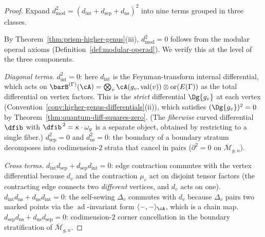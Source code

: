 \begin{proof}
Expand $d_{\mathrm{mod}}^2 = (d_{\mathrm{int}} + d_{\mathrm{sep}}
+ d_{\mathrm{ns}})^2$ into nine terms grouped in three classes.

By Theorem~\ref{thm:prism-higher-genus}(iii),
$d_{\mathrm{mod}}^2 = 0$ follows from the modular operad axioms
(Definition~\ref{def:modular-operad}).  We verify this at the
level of the three components.

\emph{Diagonal terms.}
$d_{\mathrm{int}}^2 = 0$: here $d_{\mathrm{int}}$ is the
Feynman-transform internal differential, which acts on
$\barB^{(\Gamma)}(\cA) = \bigotimes_v \cA(g_v,
\operatorname{val}(v)) \otimes \operatorname{or}(E(\Gamma))$
as the total differential on vertex factors.  This is the
\emph{strict} differential $\Dg{g_v}$ at each vertex
(Convention~\ref{conv:higher-genus-differentials}(ii)), which
satisfies $(\Dg{g_v})^2 = 0$ by
Theorem~\ref{thm:quantum-diff-squares-zero}.  (The
\emph{fiberwise} curved differential $\dfib$ with
$\dfib^{\,2} = \kappa \cdot \omega_g$ is a separate object,
obtained by restricting to a single fiber.)
$d_{\mathrm{sep}}^2 = 0$ and $d_{\mathrm{ns}}^2 = 0$:
the boundary of a boundary stratum decomposes into
codimension-$2$ strata that cancel in pairs
($\partial^2 = 0$ on $\overline{\mathcal{M}}_{g,n}$).

\emph{Cross terms.}
$d_{\mathrm{int}} d_{\mathrm{sep}} + d_{\mathrm{sep}}
d_{\mathrm{int}} = 0$: edge contraction commutes with the vertex
differential because $d_v$ and the contraction $\mu_e$ act on
disjoint tensor factors (the contracting edge connects two
\emph{different} vertices, and $d_v$ acts on one).
$d_{\mathrm{int}} d_{\mathrm{ns}} + d_{\mathrm{ns}}
d_{\mathrm{int}} = 0$: the self-sewing $\Delta_v$ commutes with
$d_v$ because $\Delta_v$ pairs two marked points via the
$\operatorname{ad}$-invariant form $\langle -,- \rangle_\cA$,
which is a chain map.
$d_{\mathrm{sep}} d_{\mathrm{ns}} + d_{\mathrm{ns}}
d_{\mathrm{sep}} = 0$: codimension-$2$ corner cancellation
in the boundary stratification of $\overline{\mathcal{M}}_{g,n}$.
\end{proof}

